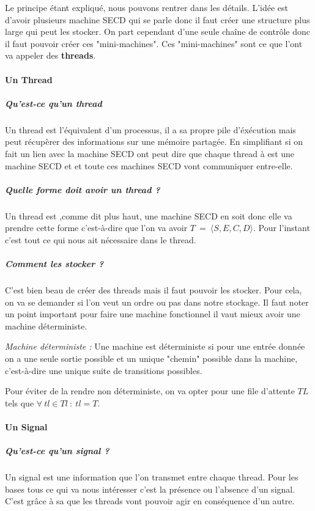 \documentclass[10pt,a4paper]{article}
\begin{document}
				Le principe étant expliqué, nous pouvons rentrer dans les détails. L'idée est d'avoir plusieurs machine SECD qui se parle donc il faut créer une structure plus large qui peut les stocker. On part cependant d'une seule chaîne de contrôle donc il faut pouvoir créer ces "mini-machines". Ces "mini-machines" sont ce que l'ont va appeler des \textbf{threads}.
				\bigbreak
					
					
				\paragraph{Un Thread}
						
					\subparagraph{Qu'est-ce qu'un thread}
					Un thread est l'équivalent d'un processus, il a sa propre pile d'éxécution mais peut récupèrer des informations sur une mémoire partagée. En simplifiant si on fait un lien avec la machine SECD ont peut dire que chaque thread à est une machine SECD et et toute ces machines SECD vont communiquer entre-elle.
						
					\subparagraph{Quelle forme doit avoir un thread ?} 
					Un thread est ,comme dit plus haut, une machine SECD en soit donc elle va prendre cette forme c'est-à-dire que l'on va avoir $T~=~\langle S,E,C,D\rangle$. Pour l'instant c'est tout ce qui nous ait nécessaire dans le thread.
						
					\subparagraph{Comment les stocker ?}
					C'est bien beau de créer des threads mais il faut pouvoir les stocker. Pour cela, on va se demander si l'on veut un ordre ou pas dans notre stockage. Il faut noter un point important pour faire une machine fonctionnel il vaut mieux avoir une machine déterministe.
					\medbreak
						
					\textit{Machine déterministe :} Une machine est déterministe si pour une entrée donnée on a une seule sortie possible et un unique "chemin" possible dans la machine, c'est-à-dire une unique suite de transitions possibles.
					\medbreak
						
					Pour éviter de la rendre non déterministe, on va opter pour une file d'attente $TL$ tels que $\forall~tl \in Tl~:~tl = T$.
					\bigbreak
						
				\paragraph{Un Signal} 
					
					\subparagraph{Qu'est-ce qu'un signal ?}
					Un signal est une information que l'on transmet entre chaque thread. Pour les bases tous ce qui va nous intéresser c'est la présence ou l'absence d'un signal. C'est grâce à sa que les threads vont pouvoir agir en conséquence d'un autre. 
						
\end{document}
